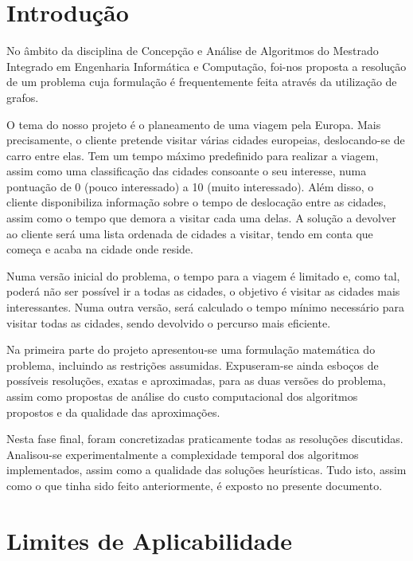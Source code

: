 \documentclass[12pt,a4paper,reqno]{report}
\numberwithin{equation}{section}
\begin{document}


\tableofcontents


\chapter{Introdução}

No âmbito da disciplina de Concepção e Análise de Algoritmos do Mestrado Integrado em Engenharia Informática e Computação, foi-nos proposta a resolução de um problema cuja formulação é frequentemente feita através da utilização de grafos.

O tema do nosso projeto é o planeamento de uma viagem pela Europa. Mais precisamente, o cliente pretende visitar várias cidades europeias, deslocando-se de carro entre elas. Tem um tempo máximo predefinido para realizar a viagem, assim como uma classificação das cidades consoante o seu interesse, numa pontuação de 0 (pouco interessado) a 10 (muito interessado). Além disso, o cliente disponibiliza informação sobre o tempo de deslocação entre as cidades, assim como o tempo que demora a visitar cada uma delas. A solução a devolver ao cliente será uma lista ordenada de cidades a visitar, tendo em conta que começa e acaba na cidade onde reside.

Numa versão inicial do problema, o tempo para a viagem é limitado e, como tal, poderá não ser possível ir a todas as cidades, o objetivo é visitar as cidades mais interessantes. Numa outra versão, será calculado o tempo mínimo necessário para visitar todas as cidades, sendo devolvido o percurso mais eficiente.

Na primeira parte do projeto apresentou-se uma formulação matemática do problema, incluindo as restrições assumidas. Expuseram-se ainda esboços de possíveis resoluções, exatas e aproximadas, para as duas versões do problema, assim como propostas de análise do custo computacional dos algoritmos propostos e da qualidade das aproximações.

Nesta fase final, foram concretizadas praticamente todas as resoluções discutidas. Analisou-se experimentalmente a complexidade temporal dos algoritmos implementados, assim como a qualidade das soluções heurísticas. Tudo isto, assim como o que tinha sido feito anteriormente, é exposto no presente documento.

\chapter{Limites de Aplicabilidade}
\end{document}
